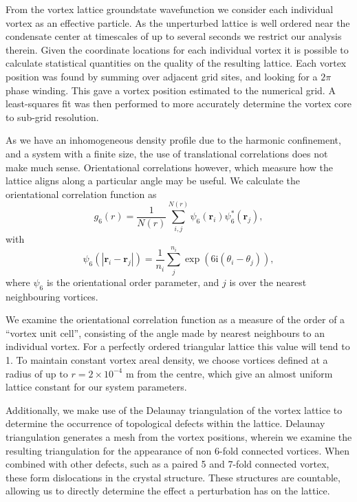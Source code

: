 From the vortex lattice groundstate wavefunction we consider each individual vortex as an effective particle. As the unperturbed lattice is well ordered near the condensate center at timescales of up to several seconds we restrict our analysis therein. Given the coordinate locations for each individual vortex it is possible to calculate statistical quantities on the quality of the resulting lattice. Each vortex position was found by summing over adjacent grid sites, and looking for a $2\pi$ phase winding. This gave a vortex position estimated to the numerical grid. A least-squares fit was then performed to more accurately determine the vortex core to sub-grid resolution.

As we have an inhomogeneous density profile due to the harmonic confinement, and a system with a finite size, the use of translational correlations does not make much sense. Orientational correlations however, which measure how the lattice aligns along a particular angle may be useful. We calculate the orientational correlation function as
\begin{equation}
	g_6(r) = \frac{1}{N(r)}\displaystyle\sum\limits_{i,j}^{N(r)}\psi_6(\mathbf{r}_i)\psi_6^{*}(\mathbf{r}_j),
\end{equation}
with
\begin{equation}
	\psi_6(|\mathbf{r}_{i} - \mathbf{r}_{j}|) = \frac{1}{n_i}\displaystyle\sum\limits_j^{n_i}\exp(6\mathrm{i}(\theta_i - \theta_j)),
\end{equation}
where $\psi_6$ is the orientational order parameter, and $j$ is over the nearest neighbouring vortices.

We examine the orientational correlation function as a measure of the order of a ``vortex unit cell'', consisting of the angle made by nearest neighbours to an individual vortex. For a perfectly ordered triangular lattice this value will tend to 1. To maintain constant vortex areal density, we choose vortices defined at a radius of up to $r=2\times 10^{-4}$ m from the centre, which give an almost uniform lattice constant for our system parameters.

Additionally, we make use of the Delaunay triangulation of the vortex lattice to determine the occurrence of topological defects within the lattice. Delaunay triangulation generates a mesh from the vortex positions, wherein we examine the resulting triangulation for the appearance of non 6-fold connected vortices. When combined with other defects, such as a paired 5 and 7-fold connected vortex, these form dislocations in the crystal structure. These structures are countable, allowing us to directly determine the effect a perturbation has on the lattice.


